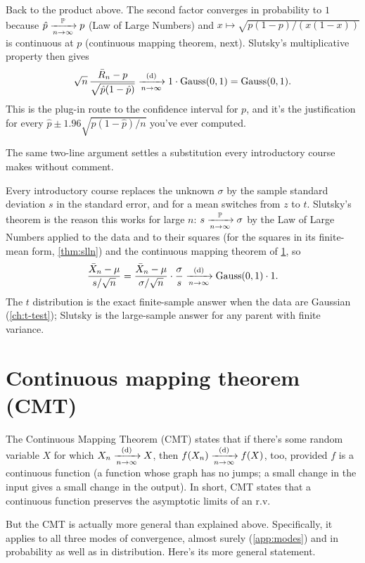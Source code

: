 \begin{worked}
Back to the product above.
The second factor converges in probability to $1$ because $\hat{p} \xrightarrow [n \to \infty ]{\mathbb{P}} p$ (Law of Large Numbers) and $x \mapsto \sqrt{p(1-p)/(x(1-x))}$ is continuous at $p$ (continuous mapping theorem, next).
Slutsky's multiplicative property then gives
\[
\sqrt{n} \, \frac{\bar{R}_n - p}{\sqrt{\hat{p}(1-\hat{p})}} \xrightarrow [n \to \infty ]{\text{(d)}} 1 \cdot \text{Gauss}(0,1) = \text{Gauss}(0,1).
\]
This is the plug-in route to the confidence interval for $p$, and it's the justification for every $\hat{p} \pm 1.96 \sqrt{\hat{p}(1-\hat{p})/n}$ you've ever computed.
\end{worked}

The same two-line argument settles a substitution every introductory course makes without comment.

\begin{bridge}
Every introductory course replaces the unknown $\sigma$ by the sample standard deviation $s$ in the standard error, and for a mean switches from $z$ to $t$.
Slutsky's theorem is the reason this works for large $n$: $s \xrightarrow [n \to \infty ]{\mathbb{P}} \sigma$ by the Law of Large Numbers applied to the data and to their squares (for the squares in its finite-mean form, \cref{thm:slln}) and the continuous mapping theorem of \cref{sec:cmt}, so
\[
\frac{\bar{X}_n - \mu}{s/\sqrt{n}} = \frac{\bar{X}_n - \mu}{\sigma/\sqrt{n}} \cdot \frac{\sigma}{s} \xrightarrow [n \to \infty ]{\text{(d)}} \text{Gauss}(0,1) \cdot 1.
\]
The $t$ distribution is the exact finite-sample answer when the data are Gaussian (\cref{ch:t-test}); Slutsky is the large-sample answer for any parent with finite variance.
\end{bridge}

\section{Continuous mapping theorem (CMT)}
\label{sec:cmt}

The Continuous Mapping Theorem (CMT) states that if there's some random variable $X$ for which $X_n \xrightarrow [n \to \infty ]{\text{(d)}} X$, then $f(X_n) \xrightarrow [n \to \infty ]{\text{(d)}} f(X)$, too, provided $f$ is a continuous function (a function whose graph has no jumps; a small change in the input gives a small change in the output).
In short, CMT states that a continuous function preserves the asymptotic limits of an r.v.

But the CMT is actually more general than explained above.
Specifically, it applies to all three modes of convergence, almost surely (\cref{app:modes}) and in probability as well as in distribution.
Here's its more general statement.

